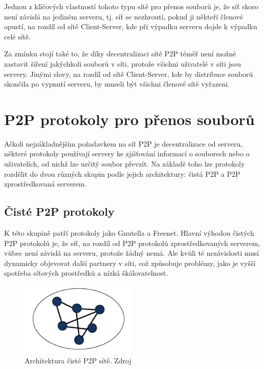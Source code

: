 \documentclass[10pt,twoside,czech,a4paper]{article}
\begin{document}
Jednou z klíčových vlastností tohoto typu sítě pro přenos souborů je, že síť skoro není závislá na jediném serveru, tj. síť se nezhroutí, pokud ji někteří členové opustí, na rozdíl od sítě Client-Server, kde při výpadku serveru dojde k výpadku celé sítě.

Za zmínku stojí také to, že díky decentralizaci sítě P2P téměř není možné zastavit šíření jakýchkoli souborů v síti, protože všichni uživatelé v síti jsou servery.
Jinými slovy, na rozdíl od sítě Client-Server, kde by distribuce souborů skončila po vypnutí serveru, by museli být všichni členové sítě vyřazeni.


\section{P2P protokoly pro přenos souborů}

Ačkoli nejzákladnějším požadavkem na síť P2P je decentralizace od serveru, některé protokoly používají servery ke zjišťování informací o souborech nebo o uživatelích, od nichž lze určitý soubor převzít.
Na základě toho lze protokoly rozdělit do dvou různých skupin podle jejich architektury: čistá P2P a P2P zprostředkovaná serverem\cite{Lui2002}.

\subsection{Čisté P2P protokoly}

K této skupině patří protokoly jako Gnutella a Freenet.
Hlavní výhodou čistých P2P protokolů je, že síť, na rozdíl od P2P protokolů zprostředkovaných serverem, vůbec není závislá na serveru, protože žádný nemá.
Ale kvůli té nezávislosti musí dynamicky objevovat další partnery v síti, což způsobuje problémy, jako je vyšší spotřeba síťových prostředků a nízká škálovatelnost\cite{Lui2002}.

\begin{figure}[ht]
	\centering
	\includegraphics[width=0.5\textwidth]{pure-p2p.png}
	\caption{Architektura čisté P2P sítě. Zdroj \cite{Leong2007}}
	\label{fig:pure-p2p}
\end{figure}
	
\end{document}
